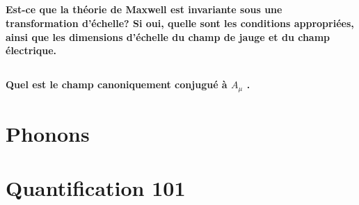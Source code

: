 \documentclass{article}
\numberwithin{equation}{section}
\theoremstyle{solution}
\begin{document}


\subsection{}
\textbf{Est-ce que la théorie de Maxwell est invariante sous une transformation d’échelle? Si
oui, quelle sont les conditions appropriées, ainsi que les dimensions d’échelle du champ de jauge
et du champ électrique.}
\vspace{2ex}
\subsection{}
\textbf{Quel est le champ canoniquement conjugué à $A_\mu$ . 
\vspace{2ex}
}

\section{Phonons}
\subsection{}
\subsection{}
\subsection{}

\section{Quantification 101}

\subsection{}
\subsection{}
\subsection{}
\subsection{}
\end{document}
